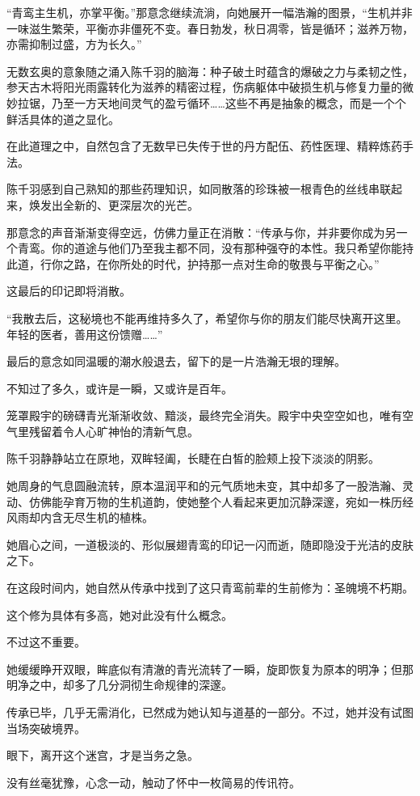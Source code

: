 “青鸾主生机，亦掌平衡。”那意念继续流淌，向她展开一幅浩瀚的图景，“生机并非一味滋生繁荣，平衡亦非僵死不变。春日勃发，秋日凋零，皆是循环；滋养万物，亦需抑制过盛，方为长久。”

无数玄奥的意象随之涌入陈千羽的脑海：种子破土时蕴含的爆破之力与柔韧之性，参天古木将阳光雨露转化为滋养的精密过程，伤病躯体中破损生机与修复力量的微妙拉锯，乃至一方天地间灵气的盈亏循环……这些不再是抽象的概念，而是一个个鲜活具体的道之显化。

在此道理之中，自然包含了无数早已失传于世的丹方配伍、药性医理、精粹炼药手法。

陈千羽感到自己熟知的那些药理知识，如同散落的珍珠被一根青色的丝线串联起来，焕发出全新的、更深层次的光芒。

那意念的声音渐渐变得空远，仿佛力量正在消散：“传承与你，并非要你成为另一个青鸾。你的道途与他们乃至我主都不同，没有那种强夺的本性。我只希望你能持此道，行你之路，在你所处的时代，护持那一点对生命的敬畏与平衡之心。”

这最后的印记即将消散。

“我散去后，这秘境也不能再维持多久了，希望你与你的朋友们能尽快离开这里。年轻的医者，善用这份馈赠……”

最后的意念如同温暖的潮水般退去，留下的是一片浩瀚无垠的理解。

不知过了多久，或许是一瞬，又或许是百年。

笼罩殿宇的磅礴青光渐渐收敛、黯淡，最终完全消失。殿宇中央空空如也，唯有空气里残留着令人心旷神怡的清新气息。

陈千羽静静站立在原地，双眸轻阖，长睫在白皙的脸颊上投下淡淡的阴影。

她周身的气息圆融流转，原本温润平和的元气质地未变，其中却多了一股浩瀚、灵动、仿佛能孕育万物的生机道韵，使她整个人看起来更加沉静深邃，宛如一株历经风雨却内含无尽生机的植株。

她眉心之间，一道极淡的、形似展翅青鸾的印记一闪而逝，随即隐没于光洁的皮肤之下。

在这段时间内，她自然从传承中找到了这只青鸾前辈的生前修为：圣魄境不朽期。

这个修为具体有多高，她对此没有什么概念。

不过这不重要。

她缓缓睁开双眼，眸底似有清澈的青光流转了一瞬，旋即恢复为原本的明净；但那明净之中，却多了几分洞彻生命规律的深邃。

传承已毕，几乎无需消化，已然成为她认知与道基的一部分。不过，她并没有试图当场突破境界。

眼下，离开这个迷宫，才是当务之急。

没有丝毫犹豫，心念一动，触动了怀中一枚简易的传讯符。


